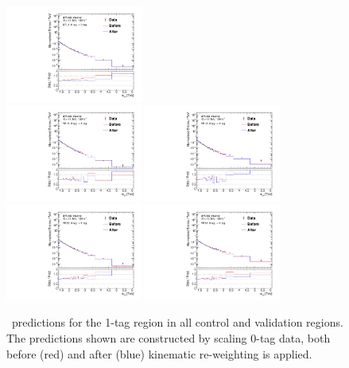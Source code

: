 \begin{figure}[htbp!]
\begin{center}
\includegraphics[width=0.40\textwidth]{BDT/VHqqbbBDTReweightShape_mVH_CR_0tag_to_1tag.pdf} \\
\includegraphics[width=0.40\textwidth]{BDT/VHqqbbBDTReweightShape_mVH_VR1B_0tag_to_1tag.pdf}
\includegraphics[width=0.40\textwidth]{BDT/VHqqbbBDTReweightShape_mVH_VR1A_0tag_to_1tag.pdf} \\
\includegraphics[width=0.40\textwidth]{BDT/VHqqbbBDTReweightShape_mVH_VR2B_0tag_to_1tag.pdf}
\includegraphics[width=0.40\textwidth]{BDT/VHqqbbBDTReweightShape_mVH_VR2A_0tag_to_1tag.pdf}
\end{center}
\caption{\mvh\ predictions for the 1-tag region in all control and validation regions. The predictions shown are constructed by scaling 0-tag data, both before (red) and after (blue) kinematic re-weighting is applied.}
\label{fig:bdt_shape_mVH_1tag}
\end{figure}

